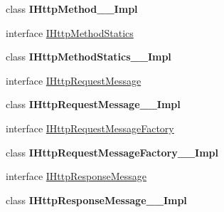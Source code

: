 \begin{DoxyCompactItemize}
class {\bfseries I\+Http\+Method\+\_\+\+\_\+\+Impl}
\item 
interface \hyperlink{interface_windows_1_1_web_1_1_http_1_1_i_http_method_statics}{I\+Http\+Method\+Statics}
\item 
class {\bfseries I\+Http\+Method\+Statics\+\_\+\+\_\+\+Impl}
\item 
interface \hyperlink{interface_windows_1_1_web_1_1_http_1_1_i_http_request_message}{I\+Http\+Request\+Message}
\item 
class {\bfseries I\+Http\+Request\+Message\+\_\+\+\_\+\+Impl}
\item 
interface \hyperlink{interface_windows_1_1_web_1_1_http_1_1_i_http_request_message_factory}{I\+Http\+Request\+Message\+Factory}
\item 
class {\bfseries I\+Http\+Request\+Message\+Factory\+\_\+\+\_\+\+Impl}
\item 
interface \hyperlink{interface_windows_1_1_web_1_1_http_1_1_i_http_response_message}{I\+Http\+Response\+Message}
\item 
class {\bfseries I\+Http\+Response\+Message\+\_\+\+\_\+\+Impl}
\end{DoxyCompactItemize}
